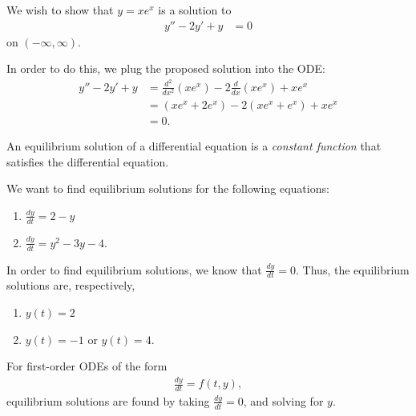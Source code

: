 \documentclass[10pt]{mypackage}
\begin{document}
  \begin{example}
    We wish to show that $y = xe^{x}$ is a solution to
    \begin{align*}
      y'' - 2y' + y &= 0
    \end{align*}
    on $(-\infty,\infty)$.\newline

    In order to do this, we plug the proposed solution into the ODE:
    \begin{align*}
      y'' - 2y' + y &= \frac{d^2}{dx^2}\left(xe^{x}\right) - 2\frac{d}{dx}\left(xe^x\right) + xe^x\\
                    &= \left(xe^x + 2e^x\right) - 2\left(xe^x + e^x\right) + xe^x\\
                    &= 0.
    \end{align*}
  \end{example}
  \begin{definition}
    An equilibrium solution of a differential equation is a \textit{constant function} that satisfies the differential equation.
  \end{definition}
  \begin{example}
    We want to find equilibrium solutions for the following equations:
    \begin{enumerate}[(1)]
      \item $\frac{dy}{dt} = 2-y$
      \item $\frac{dy}{dt} = y^2 - 3y - 4$.
    \end{enumerate}
    In order to find equilibrium solutions, we know that $\frac{dy}{dt} = 0$. Thus, the equilibrium solutions are, respectively,
    \begin{enumerate}[(1)]
      \item $y(t) = 2$
      \item $y(t) = -1$ or $y(t) = 4$.
    \end{enumerate}
  \end{example}
  For first-order ODEs of the form
  \begin{align*}
    \frac{dy}{dt} = f(t,y),
  \end{align*}
  equilibrium solutions are found by taking $\frac{dy}{dt} = 0$, and solving for $y$.
\end{document}
